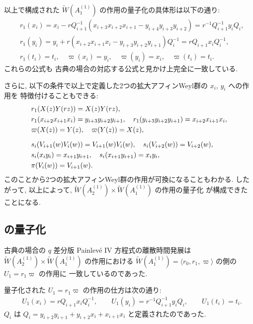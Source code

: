 \documentclass[12pt,twoside,dvipdfm]{msjproc}
\theoremstyle{definition} %
\theoremstyle{definition} %
\theoremstyle{definition} %
\numberwithin{theorem}{section}
\numberwithin{equation}{section}
\numberwithin{figure}{section}
\numberwithin{table}{section}
\newcommand\qP[1]{{\text{$q\mathrm{P}_{\text{#1}}$}}}
\newcommand\bra{\langle}
\newcommand\ket{\rangle}
\newcommand\WW{\widetilde{W}}
\begin{document}
以上で構成された $\WW(A^{(1)}_1)$ の作用の量子化の具体形は以下の通り:
\begin{align*}
 &
 r_1(x_i) 
 = x_i - r Q_{i+1}^{-1}(x_{i+3}x_{i+2}x_{i+1}-y_{i+4}y_{i+3}y_{i+2})
 = r^{-1} Q_{i+1}^{-1}y_i Q_i,
 \\ &
 r_1(y_i)
 = y_i + r(x_{i+2}x_{i+1}x_i-y_{i+3}y_{i+2}y_{i+1})Q_i^{-1}
 = r Q_{i+1} x_i Q_i^{-1},
 \\ &
 r_1(t_i) = t_i,  \quad
 \varpi(x_i)=y_i,   \quad
 \varpi(y_i)=x_i,   \quad
 \varpi(t_i)=t_i.
\end{align*}
これらの公式も
古典の場合の対応する公式と見かけ上完全に一致している.

さらに, 以下の条件で以上で定義した2つの拡大アフィンWeyl群の $x_i$, $y_i$ への作用を
特徴付けることもできる:
\begin{align*}
 &
 r_1(X(z)Y(rz)) = X(z)Y(rz), 
 \\ &
 r_1(x_{i+2}x_{i+1}x_i) = y_{i+3}y_{i+2}y_{i+1}, \quad
 r_1(y_{i+3}y_{i+2}y_{i+1}) = x_{i+2}x_{i+1}x_i,
 \\ &
 \varpi(X(z)) = Y(z), \quad
 \varpi(Y(z)) = X(z),
 \\[\medskipamount] &
 s_i(V_{i+1}(w)V_i(w)) = V_{i+1}(w)V_i(w), \quad
 s_i(V_{i+2}(w))=V_{i+2}(w),
 \\ &
 s_i(x_i y_i) = x_{i+1}y_{i+1}, \quad 
 s_i(x_{i+1}y_{i+1})= x_i y_i,
 \\ &
 \pi(V_i(w)) = V_{i+1}(w).
\end{align*}
このことから2つの拡大アフィンWeyl群の作用が可換になることもわかる.
したがって, 以上によって, $\WW(A^{(1)}_2)\times\WW(A^{(1)}_1)$ の作用の量子化
が構成できたことになる.




\subsection{\qP{IV} の量子化}
\label{sec:qqPIV}

古典の場合の $q$ 差分版 Painlev\'e IV 方程式の離散時間発展は
$\WW(A^{(1)}_2)\times\WW(A^{(1)}_1)$ の作用における
$\WW(A^{(1)}_1)=\bra r_0,r_1, \varpi\ket$ の側の $U_1=r_1\varpi$ の作用に
一致しているのであった. 

量子化された $U_1=r_1\varpi$ の作用の仕方は次の通り:
\begin{align*}
 &
 U_1(x_i) = r Q_{i+1} x_i Q_i^{-1},
 \qquad
 U_1(y_i) = r^{-1} Q_{i+1}^{-1}y_i Q_i,
 \qquad
 U_1(t_i) = t_i.%
\end{align*}
$Q_i$ は $Q_i=y_{i+2}y_{i+1} + y_{i+2}x_i + x_{i+1}x_i$ と定義されたのであった.
\end{document}
